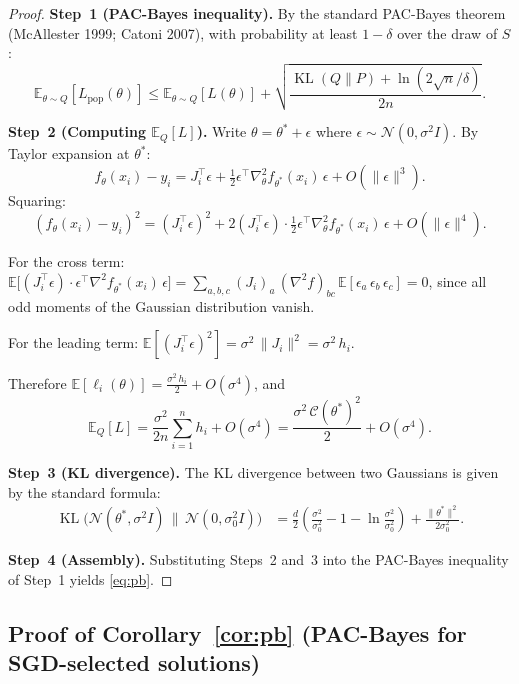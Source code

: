 \documentclass[11pt,a4paper]{article}
\theoremstyle{definition}
\theoremstyle{remark}
\DeclareMathOperator{\KL}{KL}
\newcommand{\E}{\mathbb{E}}
\newcommand{\cC}{\mathcal{C}}
\begin{document}
\begin{proof}
\textbf{Step~1 (PAC-Bayes inequality).}\;
By the standard PAC-Bayes theorem (McAllester 1999; Catoni 2007), with
probability at least $1 - \delta$ over the draw of $S$:
\[
  \E_{\theta \sim Q}[L_{\mathrm{pop}}(\theta)]
  \leq \E_{\theta \sim Q}[L(\theta)]
  + \sqrt{\frac{\KL(Q \| P) + \ln(2\sqrt{n}/\delta)}{2n}}.
\]

\textbf{Step~2 (Computing $\E_Q[L]$).}\;
Write $\theta = \theta^* + \epsilon$ where $\epsilon \sim \mathcal{N}(0, \sigma^2 I)$.
By Taylor expansion at $\theta^*$:
\[
  f_\theta(x_i) - y_i
  = J_i^\top \epsilon
  + \tfrac{1}{2}\epsilon^\top \nabla^2_\theta f_{\theta^*}(x_i)\,\epsilon
  + O(\|\epsilon\|^3).
\]
Squaring:
\[
  (f_\theta(x_i) - y_i)^2
  = (J_i^\top \epsilon)^2
  + 2(J_i^\top \epsilon) \cdot \tfrac{1}{2}\epsilon^\top \nabla^2_\theta f_{\theta^*}(x_i)\,\epsilon
  + O(\|\epsilon\|^4).
\]

For the cross term:
$\E\!\bigl[(J_i^\top \epsilon) \cdot \epsilon^\top \nabla^2 f_{\theta^*}(x_i)\,\epsilon\bigr]
= \sum_{a,b,c} (J_i)_a\,(\nabla^2 f)_{bc}\,\E[\epsilon_a\,\epsilon_b\,\epsilon_c] = 0$,
since all odd moments of the Gaussian distribution vanish.

For the leading term:
$\E[(J_i^\top \epsilon)^2] = \sigma^2\,\|J_i\|^2 = \sigma^2\, h_i$.

Therefore
$\E[\ell_i(\theta)] = \frac{\sigma^2\, h_i}{2} + O(\sigma^4)$,
and
\[
  \E_Q[L]
  = \frac{\sigma^2}{2n}\sum_{i=1}^n h_i + O(\sigma^4)
  = \frac{\sigma^2\,\cC(\theta^*)^2}{2} + O(\sigma^4).
\]

\textbf{Step~3 (KL divergence).}\;
The KL divergence between two Gaussians is given by the standard formula:
\begin{align*}
  \KL\!\bigl(\mathcal{N}(\theta^*, \sigma^2 I) \,\|\,
  \mathcal{N}(0, \sigma_0^2 I)\bigr)
  &= \frac{d}{2}\!\left(\frac{\sigma^2}{\sigma_0^2}
  - 1 - \ln\frac{\sigma^2}{\sigma_0^2}\right)
  + \frac{\|\theta^*\|^2}{2\sigma_0^2}.
\end{align*}

\textbf{Step~4 (Assembly).}\;
Substituting Steps~2 and~3 into the PAC-Bayes inequality of Step~1 yields
\eqref{eq:pb}.
\end{proof}

\subsection{Proof of Corollary~\ref{cor:pb} (PAC-Bayes for SGD-selected solutions)}
\end{document}
